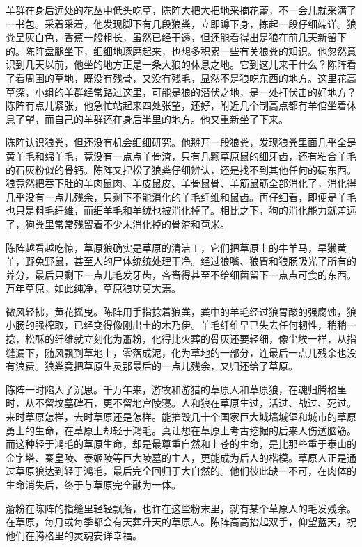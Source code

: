 \par 羊群在身后远处的花丛中低头吃草，陈阵大把大把地采摘花蕾，不一会儿就采满了一书包。采着采着，他发现脚下有几段狼粪，立即蹲下身，拣起一段仔细端详。狼粪呈灰白色，香蕉一般粗长，虽然已经干透，但还能看得出是狼在前几天新留下的。陈阵盘腿坐下，细细地琢磨起来，也想多积累一些有关狼粪的知识。他忽然意识到几天以前，他坐的地方正是一条大狼的休息之地。它到这儿来干什么？陈阵看了看周围的草地，既没有残骨，又没有残毛，显然不是狼吃东西的地方。这里花高草深，小组的羊群经常路过这里，可能是狼的潜伏之地，是一处打伏击的好地方？陈阵有点儿紧张，他急忙站起来四处张望，还好，附近几个制高点都有羊倌坐着休息了望，而自己的羊群还在身后半里的地方。他又重新坐了下来。
\par 陈阵认识狼粪，但还没有机会细细研究。他掰开一段狼粪，发现狼粪里面几乎全是黄羊毛和绵羊毛，竟没有一点点羊骨渣，只有几颗草原鼠的细牙齿，还有粘合羊毛的石灰粉似的骨钙。陈阵又捏松了狼粪仔细辨认，还是找不到其他任何的硬东西。狼竟然把吞下肚的羊肉鼠肉、羊皮鼠皮、羊骨鼠骨、羊筋鼠筋全部消化了，消化得几乎没有一点儿残余，只剩下不能消化的羊毛纤维和鼠齿。再仔细看，即便是羊毛也只是粗毛纤维，而细羊毛和羊绒也被消化掉了。相比之下，狗的消化能力就差远了，狗粪里常常残留着不少未消化掉的骨渣和苞米。
\par 陈阵越看越吃惊，草原狼确实是草原的清洁工，它们把草原上的牛羊马，旱獭黄羊，野兔野鼠，甚至人的尸体统统处理干净。经过狼嘴、狼胃和狼肠吸光了所有的养分，最后只剩下一点儿毛发牙齿，吝啬得甚至不给细菌留下一点点可食的东西。万年草原，如此纯净，草原狼功莫大焉。
\par 微风轻拂，黄花摇曳。陈阵用手指捻着狼粪，粪中的羊毛经过狼胃酸的强腐蚀，狼小肠的强榨取，已经变得像刚出土的木乃伊。羊毛纤维早已失去任何韧性，稍稍一捻，松酥的纤维就立刻化为齑粉，化得比火葬的骨灰还要轻细，像尘埃一样，从指缝漏下，随风飘到草地上，零落成泥，化为草地的一部分，连最后一点儿残余也没有浪费。狼粪竟把草原生灵那最后的一点儿残余，又归还给了草原。
\par 陈阵一时陷入了沉思。千万年来，游牧和游猎的草原人和草原狼，在魂归腾格里时，从不留坟墓碑石，更不留地宫陵寝。人和狼在草原生过，活过、战过、死过。来时草原怎样，去时草原还是怎样。能摧毁几十个国家巨大城墙城堡和城市的草原勇士的生命，在草原上却轻于鸿毛。真让想在草原上考古挖掘的后来人伤透脑筋。而这种轻于鸿毛的草原生命，却是最尊重自然和上苍的生命，是比那些重于泰山的金字塔、秦皇陵、泰姬陵等巨大陵墓的主人，更能成为后人的楷模。草原人正是通过草原狼达到轻于鸿毛，最后完全回归于大自然的。他们彼此缺一不可，在肉体的生命消失后，终于与草原完全融为一体。
\par 齑粉在陈阵的指缝里轻轻飘落，也许在这些粉末里，就有某个草原人的毛发残余。在草原，每月或每季都会有天葬升天的草原人。陈阵高高抬起双手，仰望蓝天，祝他们在腾格里的灵魂安详幸福。

